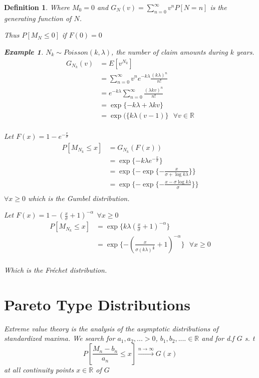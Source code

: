 \documentclass[11pt,a4paper,oneside]{article}\usepackage[]{graphicx}\usepackage[]{color}
\newtheorem{defi}[subsection]{Definition}
\newtheorem{exm}{Example}
\begin{document}
\begin{algin*}
\begin{defi}
Where $M_0=0$ and $G_N(v)=\displaystyle\sum_{n=0}^{\infty}v^nP[N=n]$ is the generating function of $N$.

Thus $P[M_N\leq 0]$ if $F(0)=0$

\begin{exm}$N_k\sim Poisson(k,\lambda)$, the number of claim amounts during $k$ years.
\begin{align*}
G_{N_k}(v)&=E[v^{N_k}]\\
&=\displaystyle\sum_{n=0}^{\infty}v^ne^{-k\lambda}\frac{(k\lambda)^n}{n!}\\
&=e^{-k\lambda}\displaystyle\sum_{n=0}^{\infty}\frac{(\lambda kv)^n}{n!}\\
&=\exp\{-k\lambda+\lambda k v\}\\
&=\exp(\{k\lambda(v-1)\}\ \ \ \forall v\in\mathbb{R}\\
\end{align*}

Let $F(x)=1-e^{-\frac{x}{\sigma}}$
\begin{align*}
P[M_{N_k}\leq x]&=G_{N_k}(F(x))\\
&=\exp\{-k\lambda e^{-\frac{x}{\sigma}}\}\\
&=\exp\{-\exp\{-\frac{x}{\sigma+\log k\lambda}\}\}\\
&=\exp\{-\exp\{-\frac{x-\sigma \log  k\lambda}{\sigma}\}\}\\
\end{align*}
$\forall x\geq 0$ which is the Gumbel distribution.

Let $F(x)=1-(\frac{x}{\sigma}+1)^{-\alpha}\ \ \forall x\geq 0$
\begin{align*}
P[M_{N_k}\leq x]&=\exp\{k\lambda(\frac{x}{\sigma}+1)^{-\alpha}\}\\
&=\exp\{-(\frac{x}{\sigma(k\lambda)^{\frac{1}{\alpha}}}+1)^{-\alpha}\}\ \ \ \forall x \geq 0\\
\end{align*}

Which is the Fréchet distribution.
\end{exm}
\section{Pareto Type Distributions}
Extreme value theory is the analysis of the asymptotic distributions of standardized maxima.
We search for $a_1,a_2,...>0$, $b_1,b_2,....\in\mathbb{R}$ and for d.f $G$ s. t
$$P\left[\frac{M_n-b_n}{a_n}\leq x\right]\xrightarrow{n\rightarrow\infty}G(x)$$
at all continuity points $x\in\mathbb{R}$ of $G$


\end{defi}
\end{algin*}
\end{document}
